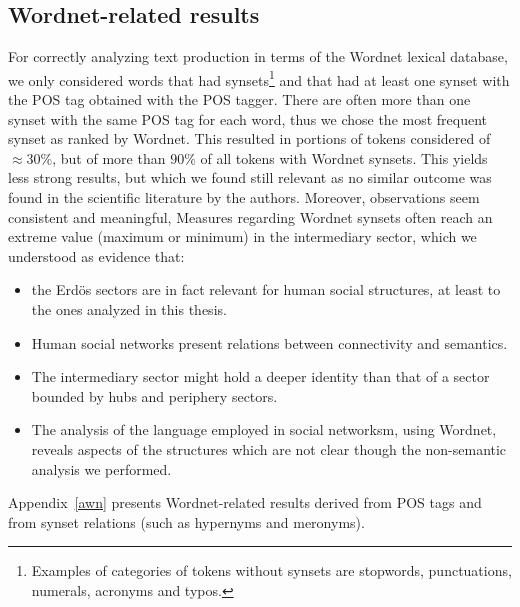 \documentclass[review]{elsarticle}
\begin{document}
\subsection{Wordnet-related results}
For correctly analyzing text production in terms of the Wordnet lexical database,
we only considered words that had synsets\footnote{
  Examples of categories of tokens without synsets are stopwords, punctuations, numerals, acronyms and typos.}
and that had at least one synset with the POS tag obtained with the POS tagger.
There are often more than one synset with the same POS tag for each word,
thus we chose the most frequent synset as ranked by Wordnet.
This resulted in portions of tokens considered of $\approx 30\%$,
but of more than $90\%$ of all tokens with Wordnet synsets.
This yields less strong results, but which we found still relevant as no similar outcome was found in the scientific literature by the authors.
Moreover, observations seem consistent and meaningful,
Measures regarding Wordnet synsets often reach an extreme value (maximum or minimum)
in the intermediary sector, which we understood as evidence that:
\begin{itemize}
\item the Erd\"os sectors are in fact relevant for human social structures, at least to the ones analyzed in this thesis.
\item Human social networks present relations between connectivity and semantics.
\item The intermediary sector might hold a deeper identity than that of a sector bounded by hubs and periphery sectors.
\item The analysis of the language employed in social networksm, using Wordnet, reveals aspects of the structures which are not clear though the non-semantic analysis we performed.
\end{itemize}

Appendix~\ref{awn} presents Wordnet-related results derived from POS tags and from synset relations (such as hypernyms and meronyms). 
\end{document}
